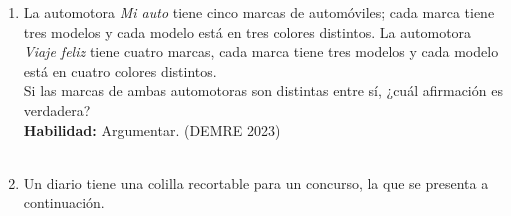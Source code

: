 \documentclass[11pt,letterpaper]{article}
\newenvironment{alternativas}{%
\begin{enumerate}[label=\Alph*), leftmargin=14pt, itemsep=2pt, topsep=2pt]
}{\end{enumerate}}
\begin{document}
\begin{enumerate}[label=\textbf{\arabic*.}, leftmargin=*, itemsep=8pt, start=6]
\item
\begin{minipage}[t]{\linewidth}
La automotora \textit{Mi auto} tiene cinco marcas de automóviles; cada marca tiene tres modelos y cada modelo está en tres colores distintos. La automotora \textit{Viaje feliz} tiene cuatro marcas, cada marca tiene tres modelos y cada modelo está en cuatro colores distintos.\\
Si las marcas de ambas automotoras son distintas entre sí, ¿cuál afirmación es verdadera?\\
\textbf{Habilidad:} Argumentar. (DEMRE 2023)\\
\\%
\begin{minipage}{\linewidth}
\vspace{7mm}
\end{minipage}
\vspace{7mm}
\end{minipage}

\item
\begin{minipage}[t]{\linewidth}
Un diario tiene una colilla recortable para un concurso, la que se presenta a continuación.\\


\end{minipage}
\end{enumerate}
\end{document}
